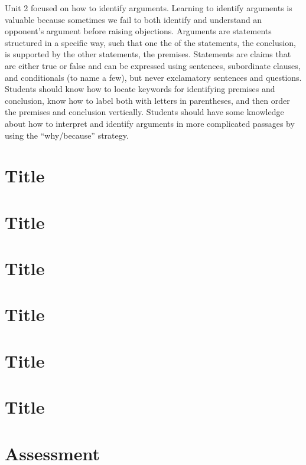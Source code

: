 \documentclass[
]{book}
\begin{document}
Unit 2 focused on how to identify arguments. Learning to identify arguments is valuable because sometimes we fail to both identify and understand an opponent's argument before raising objections. Arguments are statements structured in a specific way, such that one the of the statements, the conclusion, is supported by the other statements, the premises. Statements are claims that are either true or false and can be expressed using sentences, subordinate clauses, and conditionals (to name a few), but never exclamatory sentences and questions. Students should know how to locate keywords for identifying premises and conclusion, know how to label both with letters in parentheses, and then order the premises and conclusion vertically. Students should have some knowledge about how to interpret and identify arguments in more complicated passages by using the ``why/because'' strategy.

\hypertarget{title}{%
\chapter{Title}\label{title}}

\hypertarget{title-1}{%
\chapter{Title}\label{title-1}}

\hypertarget{title-2}{%
\chapter{Title}\label{title-2}}

\hypertarget{title-3}{%
\chapter{Title}\label{title-3}}

\hypertarget{title-4}{%
\chapter{Title}\label{title-4}}

\hypertarget{title-5}{%
\chapter{Title}\label{title-5}}

\hypertarget{assessment-2}{%
\chapter*{Assessment}\label{assessment-2}}
\end{document}
